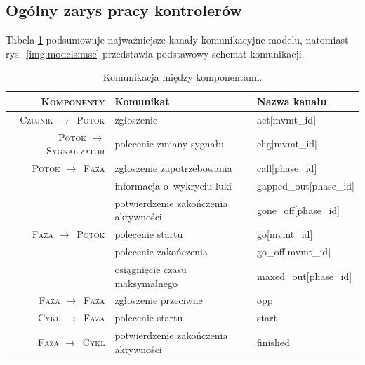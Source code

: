\documentclass{pracamgr}
\newcommand{\imgr}[1]{rys.~\ref{#1}}
\newcommand{\rarr}{$\rightarrow$}
\theoremstyle{plain}
\begin{document}
\subsection{Ogólny zarys pracy kontrolerów}
\label{ss:models:models:summary}
% 


% 

Tabela \ref{tab:models:channels} podsumowuje najważniejsze kanały
komunikacyjne modelu, natomiast \imgr{img:models:msc} przedstawia
podstawowy schemat komunikacji.

\renewcommand{\arraystretch}{1.4}
\begin{table}
  \centering
  \begin{tabular}{>{\scshape}r|p{}|>{\ttfamily}p{}}
    \firsthline\firsthline
    \textbf{Komponenty} & \textbf{Komunikat} & \textnormal{\bfseries Nazwa kanału} \\ \hline
    Czujnik \rarr\ Potok & zgłoszenie & act[mvmt\_id] \\ \hline
    Potok \rarr\ Sygnalizator & polecenie zmiany sygnału & chg[mvmt\_id]
    \\ \hline
    Potok \rarr\ Faza & zgłoszenie zapotrzebowania & call[phase\_id] \\
                      & informacja o~wykryciu luki & gapped\_out[phase\_id] \\
                      & potwierdzenie zakończenia aktywności & gone\_off[phase\_id]
    \\ \hline
    Faza \rarr\ Potok & polecenie startu & go[mvmt\_id] \\
                      & polecenie zakończenia & go\_off[mvmt\_id] \\
                      & osiągnięcie czasu maksymalnego & maxed\_out[phase\_id]
    \\ \hline
    Faza \rarr\ Faza & zgłoszenie przeciwne & opp
    \\ \hline
    Cykl \rarr\ Faza & polecenie startu & start \\ \hline
    Faza \rarr\ Cykl & potwierdzenie zakończenia aktywności & finished \\
    \hline\hline
  \end{tabular}
  \caption{Komunikacja między komponentami.}
  \label{tab:models:channels}
\end{table}
\end{document}
